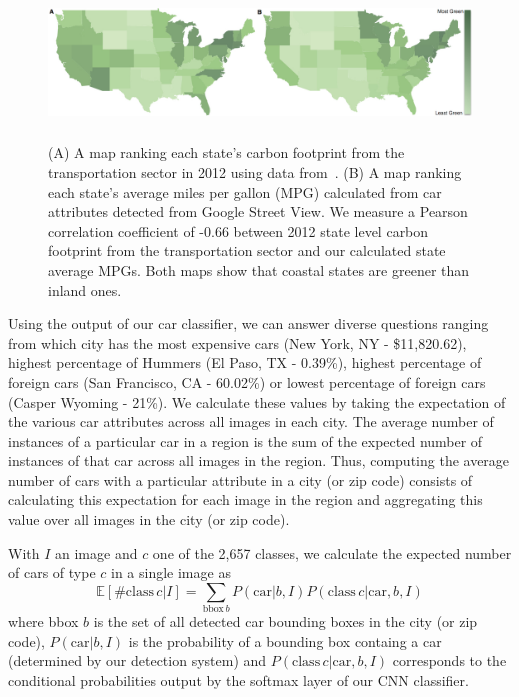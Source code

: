 \documentclass[letterpaper]{article}
\begin{document}
\begin{figure} [t]
\begin{center}
\includegraphics[width=0.9\linewidth,height=1.602in ]{img/green.jpg}
\end{center}
\caption {(A) A map ranking each state's carbon footprint from the transportation sector in 2012 using data from~\cite{state_ranking}. (B) A map ranking each state's average miles per gallon (MPG) calculated from car attributes detected from Google Street View. We measure a Pearson correlation coefficient of -0.66 between 2012 state level carbon footprint from the transportation sector and our calculated state average MPGs. Both maps show that coastal states are greener than inland ones.}
\label{fig:mpg}
\end{figure}
Using the output of our car classifier, we can answer diverse questions ranging from which city has the most expensive cars (New York, NY - \$11,820.62), highest percentage of Hummers (El Paso, TX - 0.39\%), highest percentage of foreign cars (San Francisco, CA - 60.02\%) or lowest percentage of foreign cars (Casper Wyoming - 21\%). We calculate these values by taking the expectation of the various car attributes across all images in each city. The average number of instances of a particular car in a region is the sum of the expected number of instances of that car across all images in the region. Thus, computing the average number of cars with a particular attribute in a city (or zip code) consists of calculating this expectation for each image in the region and aggregating this value over all images in the city (or zip code).

With $I$ an image and $c$ one of the 2,657 classes, we calculate the expected number of cars of type $c$ in a single image as
\begin{equation}
\mathbb{E}[\mathrm{\#class}\, c | I] = \sum_{\mathrm{bbox}\,b} P(\mathrm{car}|b,I) P(\mathrm{class}\, c | \mathrm{car},b,I)
\end{equation}
where bbox $b$ is the set of all detected car bounding boxes in the city (or zip code), $P(\mathrm{car}|b,I)$ is the probability of a bounding box containg a car (determined by our detection system) and $P(\mathrm{class}\, c | \mathrm{car},b,I)$ corresponds to the conditional probabilities output by the softmax layer of our CNN classifier.
\end{document}
